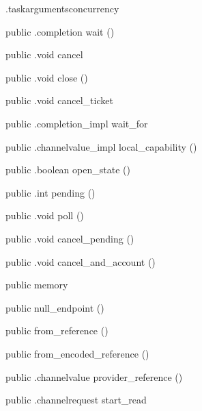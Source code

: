 \begin{CrexxClass}{.taskarguments}{concurrency}
\begin{Members}
    \Method
      {public}
      {.completion}
      {wait}
      {()}

    \Method
      {public}
      {.void}
      {cancel}
      {}

    \Method
      {public}
      {.void}
      {close}
      {()}

    \Method
      {public}
      {.void}
      {cancel\_ticket}
      {}

    \Method
      {public}
      {.completion\_impl}
      {wait\_for}
      {}

    \Method
      {public}
      {.channelvalue\_impl}
      {local\_capability}
      {()}

    \Method
      {public}
      {.boolean}
      {open\_state}
      {()}

    \Method
      {public}
      {.int}
      {pending}
      {()}

    \Method
      {public}
      {.void}
      {poll}
      {()}

    \Method
      {public}
      {.void}
      {cancel\_pending}
      {()}

    \Method
      {public}
      {.void}
      {cancel\_and\_account}
      {()}

    \Factory
      {public}
      {memory}
      {}

    \Factory
      {public}
      {null\_endpoint}
      {()}

    \Factory
      {public}
      {from\_reference}
      {()}

    \Factory
      {public}
      {from\_encoded\_reference}
      {()}

    \Method
      {public}
      {.channelvalue}
      {provider\_reference}
      {()}

    \Method
      {public}
      {.channelrequest}
      {start\_read}
      {}


\end{Members}
\end{CrexxClass}
